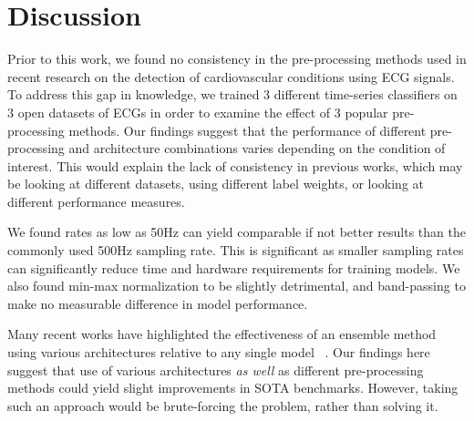 \documentclass[pmlr,twocolumn]{jmlr}%
\begin{document}
\section{Discussion}
Prior to this work, we found no consistency in the pre-processing methods used in recent research on the detection of cardiovascular conditions using ECG signals. To address this gap in knowledge, we trained 3 different time-series classifiers on 3 open datasets of ECGs in order to examine the effect of 3 popular pre-processing methods. Our findings suggest that the performance of different pre-processing and architecture combinations varies depending on the condition of interest. This would explain the lack of consistency in previous works, which may be looking at different datasets, using different label weights, or looking at different performance measures. 

We found rates as low as 50Hz can yield comparable if not better results than the commonly used 500Hz sampling rate. This is significant as smaller sampling rates can significantly reduce time and hardware requirements for training models. We also found min-max normalization to be slightly detrimental, and band-passing to make no measurable difference in model performance.

Many recent works have highlighted the effectiveness of an ensemble method using various architectures relative to any single model ~\citep{uwaechia2021comprehensive,hong2022practical,IsmailFawaz2018deep,strodthoff2020deep,chen2020detection}. Our findings here suggest that use of various architectures \textit{as well} as different pre-processing methods could yield slight improvements in SOTA benchmarks. However, taking such an approach would be brute-forcing the problem, rather than solving it. 



\appendix
\end{document}
